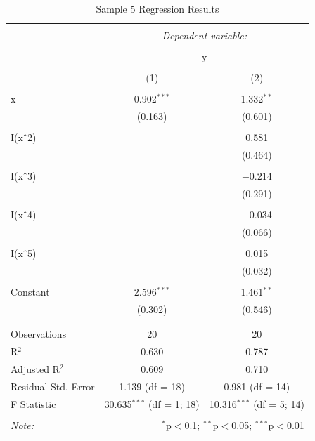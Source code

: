 \documentclass{article}
\begin{document}
\begin{table}[!htbp] \centering 
  \caption{Sample 5 Regression Results} 
  \label{} 
\begin{tabular}{@{\extracolsep{5pt}}lcc} 
\\[-1.8ex]\hline 
\hline \\[-1.8ex] 
 & \multicolumn{2}{c}{\textit{Dependent variable:}} \\ 
\cline{2-3} 
\\[-1.8ex] & \multicolumn{2}{c}{y} \\ 
\\[-1.8ex] & (1) & (2)\\ 
\hline \\[-1.8ex] 
 x & 0.902$^{***}$ & 1.332$^{**}$ \\ 
  & (0.163) & (0.601) \\ 
  & & \\ 
 I(x$\hat{\mkern6mu}$2) &  & 0.581 \\ 
  &  & (0.464) \\ 
  & & \\ 
 I(x$\hat{\mkern6mu}$3) &  & $-$0.214 \\ 
  &  & (0.291) \\ 
  & & \\ 
 I(x$\hat{\mkern6mu}$4) &  & $-$0.034 \\ 
  &  & (0.066) \\ 
  & & \\ 
 I(x$\hat{\mkern6mu}$5) &  & 0.015 \\ 
  &  & (0.032) \\ 
  & & \\ 
 Constant & 2.596$^{***}$ & 1.461$^{**}$ \\ 
  & (0.302) & (0.546) \\ 
  & & \\ 
\hline \\[-1.8ex] 
Observations & 20 & 20 \\ 
R$^{2}$ & 0.630 & 0.787 \\ 
Adjusted R$^{2}$ & 0.609 & 0.710 \\ 
Residual Std. Error & 1.139 (df = 18) & 0.981 (df = 14) \\ 
F Statistic & 30.635$^{***}$ (df = 1; 18) & 10.316$^{***}$ (df = 5; 14) \\ 
\hline 
\hline \\[-1.8ex] 
\textit{Note:}  & \multicolumn{2}{r}{$^{*}$p$<$0.1; $^{**}$p$<$0.05; $^{***}$p$<$0.01} \\ 
\end{tabular} 
\end{table} 
\end{document}
